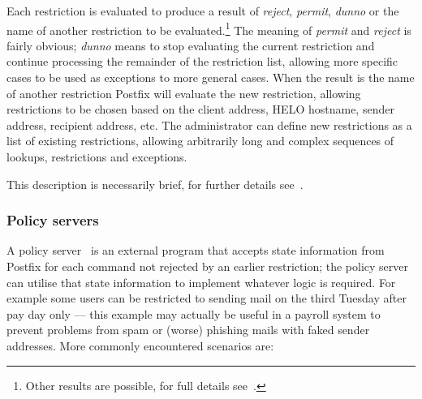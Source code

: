 \documentclass[a4paper,12pt,draft]{article}
\begin{document}
Each restriction is evaluated to produce a result of \textit{reject},
\textit{permit}, \textit{dunno\/} or the name of another restriction to be
evaluated.\footnote{Other results are possible, for full details
see~\cite{smtpd_access_readme, smtpd_per_user_control, policy-servers}.}
The meaning of \textit{permit\/} and \textit{reject\/} is fairly obvious;
\textit{dunno\/} means to stop evaluating the current restriction and
continue processing the remainder of the restriction list, allowing more
specific cases to be used as exceptions to more general cases.  When the
result is the name of another restriction Postfix will evaluate the new
restriction, allowing restrictions to be chosen based on the client \IP{}
address, HELO hostname, sender address, recipient address, etc.  The
administrator can define new restrictions as a list of existing
restrictions, allowing arbitrarily long and complex sequences of lookups,
restrictions and exceptions.

This description is necessarily brief, for further details
see~\cite{smtpd_access_readme, smtpd_per_user_control, policy-servers}.


\subsubsection{Policy servers}

\label{policy servers}

A policy server~\cite{policy-servers} is an external program that accepts
state information from Postfix for each \SMTP{} command not rejected by an
earlier restriction; the policy server can utilise that state information
to implement whatever logic is required.  For example some users can be
restricted to sending mail on the third Tuesday after pay day only --- this
example may actually be useful in a payroll system to prevent problems from
spam or (worse) phishing mails with faked sender addresses.  More commonly
encountered scenarios are:
\end{document}
